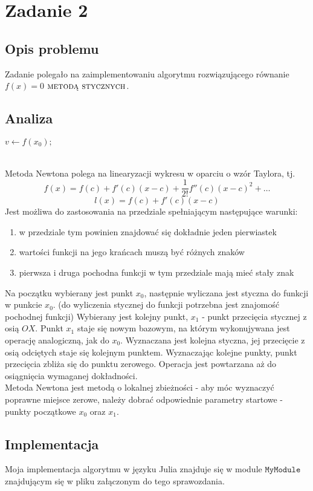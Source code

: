 \section{Zadanie 2}
\subsection{Opis problemu}
Zadanie polegało na zaimplementowaniu algorytmu rozwiązującego równanie $ f(x) = 0 $ $\textsc{metodą stycznych} $.
\subsection{Analiza}
\begin{algorithm}[H]
  $v \leftarrow f(x_0);$\\
\end{algorithm}

\ \\
Metoda Newtona polega na linearyzacji wykresu w oparciu o wzór Taylora, tj.
$$ f(x) = f(c) + f'(c)(x - c) + \frac{1}{2!}f''(c)(x - c)^{2} + \dots $$
$$ l(x) = f(c) + f'(c)(x - c) $$
Jest możliwa do zastosowania na przedziale spełniającym następujące warunki:
\begin{enumerate}
  \item w przedziale tym powinien znajdować się dokładnie jeden pierwiastek
  \item wartości funkcji na jego krańcach muszą być różnych znaków
  \item pierwsza i druga pochodna funkcji w tym przedziale mają mieć stały znak
\end{enumerate} 
Na początku wybierany jest punkt $ x_0 $, następnie wyliczana jest styczna do funkcji w punkcie $ x_0 $. (do wyliczenia stycznej do funkcji potrzebna jest znajomość pochodnej funkcji) Wybierany jest kolejny punkt, $ x_1 $ - punkt przecięcia stycznej z osią $ OX $. Punkt $ x_1 $ staje się nowym bazowym, na którym wykonujywana jest operację analogiczną, jak do $ x_0 $. Wyznaczana jest kolejna styczna, jej przecięcie z osią odciętych staje się kolejnym punktem. Wyznaczając kolejne punkty, punkt przecięcia zbliża się do punktu zerowego. Operacja jest powtarzana aż do osiągnięcia wymaganej dokładności. 
\\
Metoda Newtona jest metodą o lokalnej zbieżności - aby móc wyznaczyć poprawne miejsce zerowe, należy dobrać odpowiednie parametry startowe - punkty początkowe $x_0$ oraz $x_1$. \\


\subsection{Implementacja}
Moja implementacja algorytmu w języku Julia znajduje się w module $ \texttt{MyModule} $ znajdującym się w pliku załączonym do tego sprawozdania.